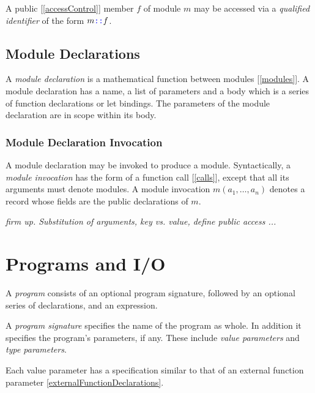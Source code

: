 \documentclass{article}
\begin{document}
A public [\ref{accessControl}] member  $f$ of module $m$ may be accessed via a {\em qualified identifier} of the form $m \texttt{\color{blue} ::}{} f$.




\subsection{Module Declarations}
\label{moduleDeclarations}

A {\em module declaration} is a mathematical function between modules [\ref{modules}].  A module declaration has a name, a list of parameters and a body which is a series of function declarations or let bindings.  The parameters  of the module declaration are in scope within its body.

\subsubsection{Module Declaration Invocation}
\label{moduleDeclarationInvocation}

A module declaration may be invoked to produce a module. Syntactically, a {\em module invocation} has the form of a function call [\ref{calls}], except that all its arguments must denote modules.
A module invocation $m(a_1, \ldots, a_n)$ denotes a record whose fields are the public declarations of $m$.

{\em firm up. Substitution of arguments, key vs. value, define public access ...}

\section{Programs and I/O}
\label{programsAndIO}

A {\em program} consists of an optional  program signature, followed by an optional  series of declarations, and an expression.

\Program{}

A {\em program signature} specifies the name of the program as whole. In addition it specifies the program's parameters, if any.  These include {\em value parameters} and {\em type parameters}. 

\ProgramSignature{}

\ProgramParameterList{}

\ProgramParameter{}

\TypeSigSuffix{}

Each value parameter has a specification similar to that of an external function parameter \ref{externalFunctionDeclarations}.
\end{document}
